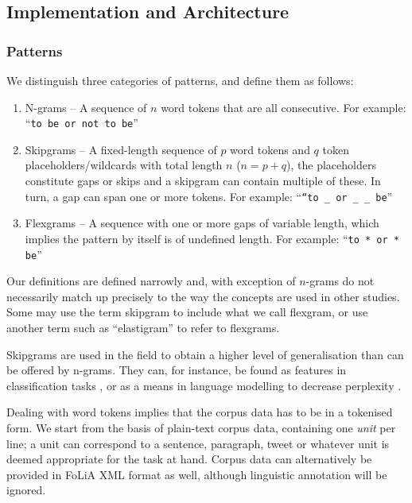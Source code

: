 \documentclass[a4paper,12pt]{article}
\begin{document}
\subsection{Implementation and Architecture}

\subsubsection{Patterns}
\label{sec:patterns}

We distinguish three categories of patterns, and define them as follows:

\begin{enumerate}
    \item N-grams -- A sequence of $n$ word tokens that are all consecutive.
        For example: ``\texttt{to be or not to be}''
    \item Skipgrams -- A fixed-length sequence of $p$ word tokens and $q$ token
        placeholders/wildcards with total length $n$ ($n=p+q$), the
        placeholders constitute gaps or skips and a skipgram can contain
        multiple of these. In turn, a gap can span one or more tokens. For
    example: ``\texttt{``to \_ or \_ \_ be}''
    \item Flexgrams -- A sequence with one or more gaps of variable length,
        which implies the pattern by itself is of undefined length. For example:
        ``\texttt{to * or * be}''
\end{enumerate}

Our definitions are defined narrowly and, with exception of $n$-grams do not
necessarily match up precisely to the way the concepts are used in other studies. Some
may use the term skipgram to include what we call flexgram, or use another term
such as ``elastigram'' to refer to flexgrams. 

Skipgrams are used in the field to obtain a higher level of generalisation than
can be offered by n-grams. They can, for instance, be found as features in
classification tasks \cite{DHONDT}, or as a means in language modelling to
decrease perplexity \cite{Guthrie06}.

Dealing with word tokens implies that the corpus data has to be in a
tokenised form. We start from the basis of plain-text corpus data, containing one
\emph{unit} per line; a unit can correspond to a sentence, paragraph, tweet
or whatever unit is deemed appropriate for the task at hand. Corpus data can
alternatively be provided in FoLiA XML format \cite{FOLIAPAPER} as well, although linguistic
annotation will be ignored.
\end{document}

